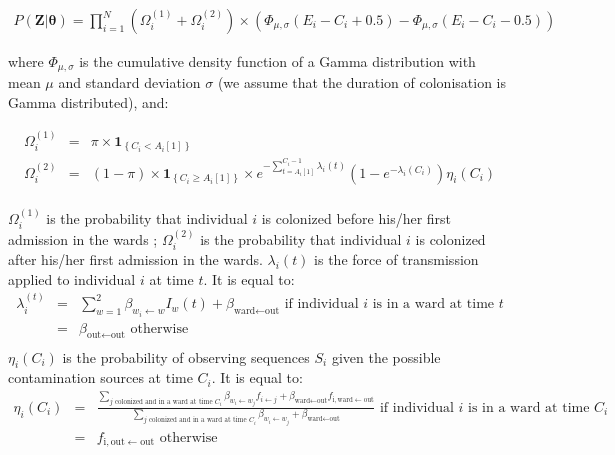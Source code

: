 \documentclass[10pt]{article}
\begin{document}
\begin{eqnarray*}
P\left(\bm{Z}|\bm{\theta}\right) = 
\bm{\prod}_{i=1}^N %
\left( \Omega_i^{\left(1\right)} + \Omega_i^{\left(2\right)} \right) \times \left(\Phi_{\mu,\sigma}\left(E_i-C_i+0.5\right) - \Phi_{\mu,\sigma}\left(E_i-C_i-0.5\right) \right)
\end{eqnarray*}

\noindent where $\Phi_{\mu,\sigma}$ is the cumulative density function of a Gamma distribution with mean $\mu$ and standard deviation $\sigma$ (we assume that the duration of colonisation is Gamma distributed), and: 

\begin{eqnarray*}
\Omega_i^{\left(1\right)} & = & \pi \times \mathbf{1}_{\left\lbrace C_i < A_i[1] \right\rbrace}  \\
\Omega_i^{\left(2\right)}  & = & \left( 1-\pi \right) \times \mathbf{1}_{\left\lbrace C_i \geq A_i[1] \right\rbrace} \times e^{-\sum_{t=A_i[1]}^{C_i-1}\lambda_i\left(t\right)} \left( 1 - e^{-\lambda_i\left(C_i\right)} \right) \eta_i\left(C_i\right)\\
\end{eqnarray*}
\bigskip

$\Omega_i^{\left(1\right)}$ is the probability that individual $i$ is colonized before his/her first admission in the wards ; $\Omega_i^{\left(2\right)}$ is the probability that individual $i$ is colonized after his/her first admission in the wards. 
$\lambda_i\left(t\right)$ is the force of transmission applied to individual $i$ at time $t$. It is equal to: 
\begin{eqnarray*}
\lambda_i^{\left(t\right)} & = & \sum_{w=1}^{2} \beta_{w_i \leftarrow w} I_w\left(t\right) + \beta_{\text{ward} \leftarrow \text{out}} \text{ if individual $i$ is in a ward at time $t$}  \\
 & = & \beta_{\text{out} \leftarrow \text{out}} \text{ otherwise}\\
\end{eqnarray*}
\bigskip
$\eta_i\left(C_i\right)$ is the probability of observing sequences $S_i$ given the possible contamination sources at time $C_i$. It is equal to: 
\begin{eqnarray*}
\eta_i\left(C_i\right) & = & \frac{\sum_{\text{$j$ colonized and in a ward at time $C_i$}} \beta_{w_i \leftarrow w_j} f_{i \leftarrow j} + \beta_{\text{ward} \leftarrow \text{out}}f_{\text{i},\text{ward} \leftarrow \text{out}} }{\sum_{\text{$j$ colonized and in a ward at time $C_i$}} \beta_{w_i \leftarrow w_j} + \beta_{\text{ward} \leftarrow \text{out}} } \text{ if individual $i$ is in a ward at time $C_i$}  \\
 & = & f_{\text{i},\text{out} \leftarrow \text{out}} \text{ otherwise}\\
\end{eqnarray*}
\bigskip
\end{document}
